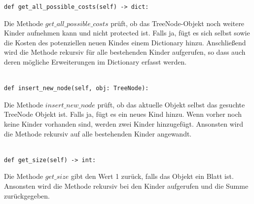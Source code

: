 \documentclass[a4paper,10pt,ngerman]{scrartcl}
\begin{document}
\begin{lstlisting}[caption={Methode \texttt{get\_all\_possible\_costs}}, label={lst:get_all_pssible_costs}]
  def get_all_possible_costs(self) -> dict:
\end{lstlisting}
Die Methode $get\_all\_possible\_costs$ prüft, ob das TreeNode-Objekt noch weitere Kinder aufnehmen kann und nicht protected ist.
Falls ja, fügt es sich selbst sowie die Kosten des potenziellen neuen Kindes einem Dictionary hinzu.
Anschließend wird die Methode rekursiv für alle bestehenden Kinder aufgerufen, so dass auch deren mögliche Erweiterungen im Dictionary erfasst werden.\\
\\
\vspace{2em} 
\begin{lstlisting}[caption={Methode \texttt{insert\_new\_node}}, label={lst:insert_new_node}]
  def insert_new_node(self, obj: TreeNode):
\end{lstlisting}
Die Methode $insert\_new\_node$ prüft, ob das aktuelle Objekt selbst das gesuchte TreeNode Objekt ist. Falls ja, fügt es ein neues Kind hinzu. 
Wenn vorher noch keine Kinder vorhanden sind, werden zwei Kinder hinzugefügt.
Ansonsten wird die Methode rekursiv auf alle bestehenden Kinder angewandt.\\
\\

\vspace{2em} 
\begin{lstlisting}[caption={Methode \texttt{get\_size}}, label={lst:get_size}]
  def get_size(self) -> int:
\end{lstlisting}
\vspace{0.5em}
Die Methode $get\_size$ gibt den Wert 1 zurück, falls das Objekt ein Blatt ist. Ansonsten wird die Methode rekursiv bei den Kinder aufgerufen und die Summe zurückgegeben.
\end{document}

